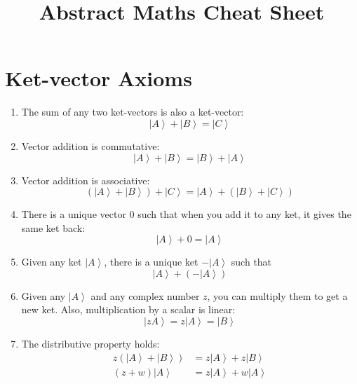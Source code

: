 \documentclass[12pt,a4paper,margin=1cm,twocolumn]{article}
\title{Abstract Maths Cheat Sheet}
\date{}
\author{}
\begin{document}
\maketitle

\section{Ket-vector Axioms}
\begin{enumerate}
    \item The sum of any two ket-vectors is also a ket-vector:
    \begin{equation}
        \left | A \right> + \left| B \right> = \left | C \right>
    \end{equation}
    \item Vector addition is commutative:
    \begin{equation}
        \left| A \right> + \left| B \right> = \left|B\right> + \left|A\right>
    \end{equation}
    \item Vector addition is associative:
    \begin{equation}
        \left( \left | A \right> + \left| B \right>\right)+ \left | C \right> = \left | A \right> +  \left(\left| B \right>+ \left | C \right>\right)
    \end{equation}
    \item There is a unique vector $0$ such that when you add it to any ket, it gives the same ket back:
    \begin{equation}
        \left| A \right> + 0 = \left| A \right>
    \end{equation}
    \item Given any ket $\left|A\right>$, there is a unique ket $-\left|A\right>$ such that
    \begin{equation}
        \left|A\right> + \left( -\left|A\right> \right)
    \end{equation}
    \item Given any $\left|A\right>$ and any complex number $z$, you can multiply them to get a new ket. Also, multiplication by a scalar is linear:
    \begin{equation}
        \left|zA\right> = z \left| A \right> = \left|B\right>
    \end{equation}
    \item The distributive property holds:
    \begin{align}
        z\left( \left|A\right> + \left|B\right>\right) &=  z\left|A\right> + z\left|B\right>\\
        \left( z+w\right)\left|A\right> &= z \left|A\right> + w \left|A\right>
    \end{align}
\end{enumerate}  
\end{document}
